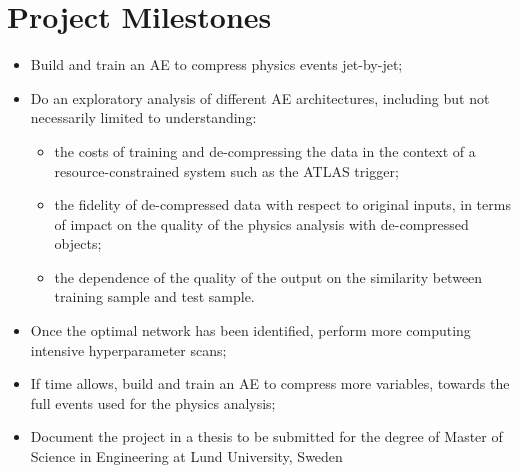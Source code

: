 \documentclass[11pt]{article}
\begin{document}


\section{Project Milestones}

\begin{itemize}
    \item Build and train an AE to compress physics events jet-by-jet;
    \item Do an exploratory analysis of different AE architectures, including but not necessarily limited to understanding:
    \begin{itemize} 
    	\item the costs of training and de-compressing the data in the context of a resource-constrained system such as the ATLAS trigger;
		\item the fidelity of de-compressed data with respect to original inputs, in terms of impact on the quality of the physics analysis with de-compressed objects;
		\item the dependence of the quality of the output on the similarity between training sample and test sample. 
	\end{itemize}
    \item Once the optimal network has been identified, perform more computing intensive hyperparameter scans;
    \item If time allows, build and train an AE to compress more variables, towards the full events used for the physics analysis;
    \item Document the project in a thesis to be submitted for the degree of Master of Science in Engineering at Lund University, Sweden
\end{itemize}{}




\end{document}
